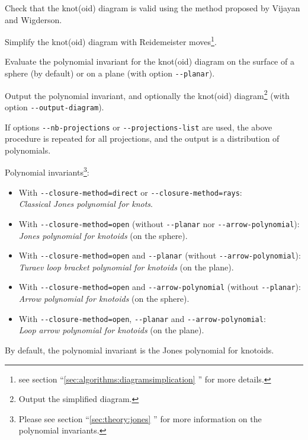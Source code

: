 Check that the knot(oid) diagram is valid using the method proposed by Vijayan and Wigderson\cite{Vijayan1982}.

Simplify the knot(oid) diagram with  Reidemeister moves\footnote{see section  ``\ref{sec:algorithms:diagramsimplication} '' for more details.}.

Evaluate the polynomial invariant for the knot(oid) diagram on the surface of a sphere (by default) or on a plane (with option \lstinline{--planar}).

Output the polynomial invariant, and optionally the knot(oid) diagram\footnote{Output the simplified diagram.} (with option \lstinline{--output-diagram}).

If options \lstinline{--nb-projections} or  \lstinline{--projections-list} are used, the above procedure is repeated for all projections, and the output is a distribution of polynomials.


Polynomial invariants\footnote{Please see section ``\ref{sec:theory:jones} '' for more information on the polynomial invariants.}:
\begin{itemize}
\item With \lstinline{--closure-method=direct} or  \lstinline{--closure-method=rays}:\\
  \emph{Classical Jones polynomial for knots}\cite{jones}.
\item With \lstinline{--closure-method=open} (without \lstinline{--planar} nor \lstinline{--arrow-polynomial}):\\
  \emph{Jones polynomial for knotoids} (on the sphere)\cite{turaev,guka}.
\item With \lstinline{--closure-method=open} and  \lstinline{--planar} (without \lstinline{--arrow-polynomial}):\\
  \emph{Turaev loop bracket polynomial for knotoids} (on the plane)\cite{turaev}.
\item With \lstinline{--closure-method=open} and \lstinline{--arrow-polynomial} (without \lstinline{--planar}):\\
  \emph{Arrow polynomial for knotoids} (on the sphere)\cite{guka,dye2009}.
\item With \lstinline{--closure-method=open}, \lstinline{--planar} and \lstinline{--arrow-polynomial}:\\
  \emph{Loop arrow polynomial for knotoids} (on the plane)\cite{gound2}.
\end{itemize}
By default, the polynomial invariant is the Jones polynomial for knotoids.


